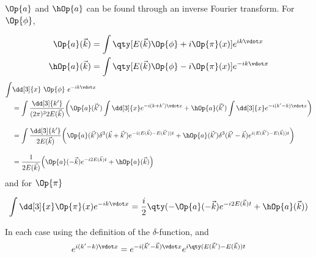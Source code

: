 \documentclass[ebook, openany, oldfontcommands,twocolumn, 10pt]{momento}
\begin{document}
\begin{expl}
\begin{derivation}
$\Op{a}$ and $\hOp{a}$ can be found through an inverse Fourier transform. 
For $\Op{\phi}$,

  \begin{align*}
   \label{eq:28}
    \Op{a}(\vec{k}) &= \int \qty[ E(\vec{k}) \Op{\phi} + i \Op{\pi}(x) ] e^{i k \vdot x} \\
   \label{eq:29}
    \hOp{a}(\vec{k}) &= \int \qty[E(\vec{k}) \Op{\phi} - i \Op{\pi}(x) ] e^{-i k \vdot x}
  \end{align*}
\begin{align*}
\int & \dd[3]{x}  \ \Op{\phi} \ e^{-ik \vdot x} \\&=
  \int \frac{\dd[3]{k'}}{(2 \pi)^3 2 E(\vec{k})} 
   \bigg( \Op{a}(\vec{k}') \int \dd[3]{x} e^{-i (k+k') \vdot x}   + \hOp{a}(\vec{k}') \int \dd[3]{x} e^{-i(k'-k) \vdot x} \bigg) 
 \\[1em] &=
 \int \frac{\dd[3]{k'}}{2 E(\vec{k})} \bigg(\Op{a}(\vec{k}') \delta^3(\vec{k} + \vec{k}') e^{-i (E(\vec{k}) - E(\vec{k}'))t}  +
 \hOp{a}(\vec{k}') \delta^3(\vec{k}' - \vec{k}) e^{i(E(\vec{k}') - E(\vec{k}))t} \bigg) 
 \\[1em] &=
\frac{1}{2 E(\vec{k})} \Big(\Op{a}(-\vec{k}) e ^{-i2E(\vec{k})t} + \hOp{a}(\vec{k}) \Big)
\end{align*}
and for $\Op{\pi}$

\begin{equation}
  \int \dd[3]{x} \Op{\pi}(x) e^{-i k \vdot x} = \frac{i}{2}
   \qty( -\Op{a}(-\vec{k}) e^{-i 2 E(\vec{k})t} + \hOp{a}(\vec{k}) )
\end{equation}

In each case using the definition of the $\delta$-function, and 
\[ 
   e^{i(k' - k) \vdot x} = e^{-i (\vec{k}' - \vec{k}) \vdot x}
                       e^{i \qty( E(\vec{k}') - E(\vec{k}) ) t}
\]


\end{derivation}
\end{expl}
\end{document}
